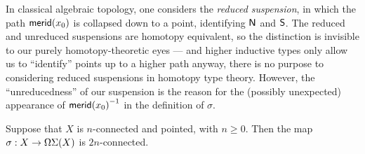 \documentclass[hott-all.tex]{subfiles}
\begin{document}
% 
\begin{rmk}
  In classical algebraic topology, one considers the \emph{reduced suspension}, in which the path $\mathsf{merid}(x_0)$ is collapsed down to a point, identifying $\mathsf{N}$ and $\mathsf{S}$.
  The reduced and unreduced suspensions are homotopy equivalent, so the distinction is invisible to our purely homotopy-theoretic eyes --- and higher inductive types only allow us to ``identify'' points up to a higher path anyway, there is no purpose to considering reduced suspensions in homotopy type theory.
  However, the ``unreducedness'' of our suspension is the reason for the (possibly unexpected) appearance of $\mathord{{\mathsf{merid}(x_0)}^{-1}}$ in the definition of $\sigma$.
\end{rmk}
% 
% 
\begin{thm}
  Suppose that $X$ is $n$-connected and pointed, with $n\geq 0$.
  Then the map $\sigma:X\to \Omega\Sigma(X)$ is $2n$-connected.
\end{thm}
% 
% 
% 
\end{document}
